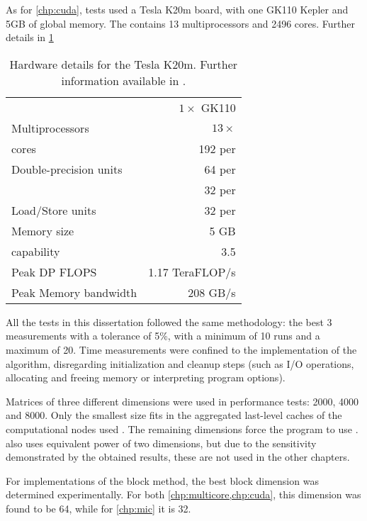 \documentclass[../thesis]{subfiles}
\begin{document}
	As for \cref{chp:cuda}, tests used a \nvidia Tesla K20m board, with one GK110 Kepler \gpu \cite{NVIDIA:KEPLER} and 5GB of  global memory. The \gpu contains 13 multiprocessors and 2496 \cuda cores. Further details in \cref{tab:k20m}

	\begin{table}[p]
		\begin{center}
			\begin{tabular}{lr}
				\hline
				\gpus & $1\times$ GK110 \\
				Multiprocessors & $13\times$ \smx \\
				\cuda cores & 192 per \smx \\
				Double-precision units & 64 per \smx \\
				\sfus & 32 per \smx \\
				Load/Store units & 32 per \smx \\
				Memory size & 5 GB \\
				\cuda capability & 3.5 \\
				\hline
				Peak DP FLOPS & 1.17 TeraFLOP/s \\
				Peak Memory bandwidth & 208 GB/s \\
				\hline
			\end{tabular}
		\end{center}
		\caption{Hardware details for the \nvidia Tesla K20m. Further information available in \cite{NVIDIA:KEPLER,NVIDIA:TeslaKSeriesOverview}.}
		\label{tab:k20m}
	\end{table}

	All the tests in this dissertation followed the same methodology: the best 3 measurements with a tolerance of 5\%, with a minimum of 10 runs and a maximum of 20. Time measurements were confined to the implementation of the algorithm, disregarding initialization and cleanup steps (such as I/O operations, allocating and freeing memory or interpreting program options).

	Matrices of three different dimensions were used in performance tests: 2000, 4000 and 8000. Only the smallest size fits in the aggregated last-level caches of the computational nodes used
	. The remaining dimensions force the program to use \dram.  also uses equivalent power of two dimensions, but due to the sensitivity demonstrated by the obtained results, these are not used in the other chapters.

	For implementations of the block method, the best block dimension was determined experimentally. For both \cref{chp:multicore,chp:cuda}, this dimension was found to be 64, while for \cref{chp:mic} it is 32.
\end{document}
